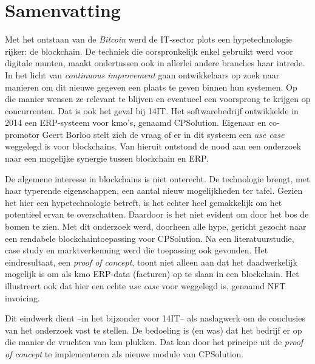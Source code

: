 
%
%
%


\chapter*{Samenvatting}

Met het ontstaan van de \textit{Bitcoin} werd de IT-sector plots een hypetechnologie rijker: de blockchain. De techniek die oorspronkelijk enkel gebruikt werd voor digitale munten, maakt ondertussen ook in allerlei andere branches haar intrede. In het licht van \textit{continuous improvement} gaan ontwikkelaars op zoek naar manieren om dit nieuwe gegeven een plaats te geven binnen hun systemen. Op die manier wensen ze relevant te blijven en eventueel een voorsprong te krijgen op concurrenten. Dat is ook het geval bij 14IT. Het softwarebedrijf ontwikkelde in 2014 een ERP-systeem voor kmo's, genaamd CPSolution. Eigenaar en co-promotor Geert Borloo stelt zich de vraag of er in dit systeem een \textit{use case} weggelegd is voor blockchains. Van hieruit ontstond de nood aan een onderzoek naar een mogelijke synergie tussen blockchain en ERP.

De algemene interesse in blockchains is niet onterecht. De technologie brengt, met haar typerende eigenschappen, een aantal nieuw mogelijkheden ter tafel. Gezien het hier een hypetechnologie betreft, is het echter heel gemakkelijk om het potentieel ervan te overschatten. Daardoor is het niet evident om door het bos de bomen te zien. Met dit onderzoek werd, doorheen alle hype, gericht gezocht naar een rendabele blockchaintoepassing voor CPSolution. Na een literatuurstudie, case study en marktverkenning werd die toepassing ook gevonden. Het eindresultaat, een \textit{proof of concept}, toont niet alleen aan dat het daadwerkelijk mogelijk is om als kmo ERP-data (facturen) op te slaan in een blockchain. Het illustreert ook dat hier een echte \textit{use case} voor weggelegd is, genaamd NFT invoicing.

Dit eindwerk dient --in het bijzonder voor 14IT-- als naslagwerk om de conclusies van het onderzoek vast te stellen. De bedoeling is (en was) dat het bedrijf er op die manier de vruchten van kan plukken. Dat kan door het principe uit de \textit{proof of concept} te implementeren als nieuwe module van CPSolution.

